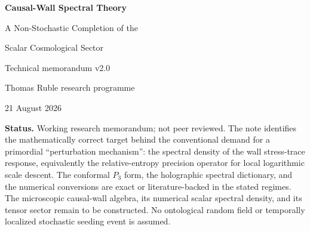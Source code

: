 \documentclass[11pt]{article}
\numberwithin{equation}{section}
\begin{document}
\begin{titlepage}
\thispagestyle{empty}
\centering
\vspace*{0.55in}
{\Huge\bfseries\color{ink} Causal-Wall Spectral Theory\par}
\vspace{0.18in}
{\LARGE A Non-Stochastic Completion of the\par}
\vspace{0.06in}
{\LARGE Scalar Cosmological Sector\par}
\vspace{0.42in}
{\Large Technical memorandum v2.0\par}
\vspace{0.58in}
{\large Thomas Ruble research programme\par}
\vspace{0.10in}
{\normalsize 21 August 2026\par}
\vfill
\begin{minipage}{0.92\textwidth}
\small
\textbf{Status.} Working research memorandum; not peer reviewed. The note identifies the mathematically correct target behind the conventional demand for a primordial ``perturbation mechanism'': the spectral density of the wall stress-trace response, equivalently the relative-entropy precision operator for local logarithmic scale descent. The conformal $P_3$ form, the holographic spectral dictionary, and the numerical conversions are exact or literature-backed in the stated regimes. The microscopic causal-wall algebra, its numerical scalar spectral density, and its tensor sector remain to be constructed. No ontological random field or temporally localized stochastic seeding event is assumed.
\end{minipage}
\end{titlepage}
\end{document}
